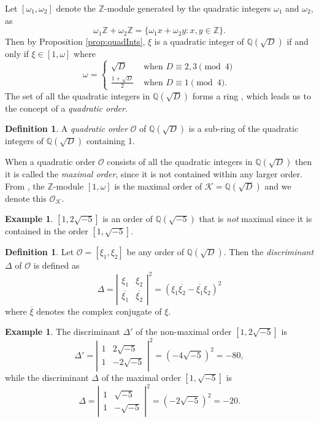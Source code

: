 \documentclass{ucalgthes1}
\theoremstyle{definition}
\newtheorem{defn}[thm]{Definition}
\newtheorem{example}[thm]{Example}
\newcommand{\ZZ}{\mathbb{Z}}
\newcommand{\QQ}{\mathbb{Q}}
\newcommand{\KK}{\mathcal{K}}
\newcommand{\OO}{\mathcal{O}}
\begin{document}
Let $[\omega_1, \omega_2]$ denote the $\ZZ$-module generated by the quadratic integers $\omega_1$ and $\omega_2$, as
\[
	\omega_1 \ZZ + \omega_2 \ZZ = \{ \omega_1 x + \omega_2 y : x, y \in \ZZ \}.
\]
Then by Proposition \ref{prop:quadInts}, $\xi$ is a quadratic integer of $\QQ(\sqrt D)$ if and only if $\xi \in [1, \omega]$ where
\[
\omega = \begin{cases}
	\sqrt D & \textrm{ when } D \equiv 2,3 \pmod 4 \\
	\frac{1 + \sqrt D}{2} & \textrm{ when } D \equiv 1 \pmod 4.
\end{cases}
\]
The set of all the quadratic integers in $\QQ(\sqrt D)$ forms a ring \cite[p.47]{Cohn1980}, which leads us to the concept of a \emph{quadratic order}.

\begin{defn}
A \emph{quadratic order} $\OO$ of $\QQ(\sqrt D)$ is a sub-ring of the quadratic integers of $\QQ(\sqrt D)$ containing 1.
\end{defn}

When a quadratic order $\OO$ consists of all the quadratic integers in $\QQ(\sqrt D)$ then it is called the \emph{maximal order}, since it is not contained within any larger order.  From \mbox{\cite[p.80]{Jacobson2009}}, the $\ZZ$-module $[1, \omega]$ is the maximal order of $\KK = \QQ(\sqrt D)$ and we denote this $\OO_{\KK}$.

\begin{example}
$[1, 2 \sqrt{-5}]$ is an order of $\QQ(\sqrt{-5})$ that is \emph{not} maximal since it is contained in the order $[1, \sqrt{-5}]$.
\end{example}

\begin{defn}
\cite[Definition 4.16]{Jacobson2009} Let $\OO = [\xi_1, \xi_2]$ be any order of $\QQ(\sqrt D)$.  Then the \emph{discriminant} $\Delta$ of $\OO$ is defined as
\[
	\Delta = {\left| \begin{array}{rr} \xi_1 & \xi_2 \\ \overline{\xi_1} & \overline{\xi_2} \end{array} \right|}^2
	       = (\xi_1 \overline{\xi_2} - \overline{\xi_1} \xi_2)^2
\]
where $\overline{\xi}$ denotes the complex conjugate of $\xi$.
\end{defn}

\begin{example}
\label{ex:discriminant}
The discriminant $\Delta'$ of the non-maximal order $[1, 2 \sqrt{-5}]$ is
\[
	\Delta' = {\left| \begin{array}{rr} 1 & 2\sqrt{-5} \\ 1 & -2\sqrt{-5} \end{array} \right|}^2 = \left( -4\sqrt{-5} \right)^2 = -80,
\]
while the discriminant $\Delta$ of the maximal order $[1,\sqrt{-5}]$ is
\[
	\Delta = {\left| \begin{array}{rr} 1 & \sqrt{-5} \\ 1 & -\sqrt{-5} \end{array} \right|}^2 = \left( -2\sqrt{-5} \right)^2 = -20.
\]
\end{example}
\end{document}
